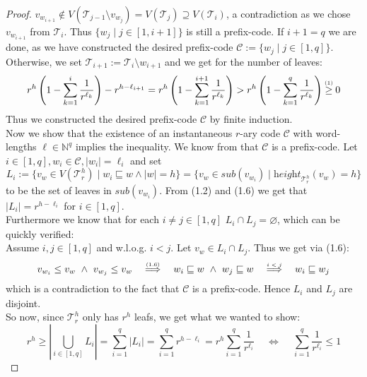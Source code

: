 \documentclass[12pt]{article}
\newcommand{\up}[2]{\mathrel{\overset{\makebox[0pt]{\mbox{\normalfont\tiny #2}}}{#1}}}
\newcommand{\T}[0]{{\mathcal{T}_r^h}}
\newcommand{\he}[0]{\textit{height}}
\newcommand{\SUB}[0]{\textit{sub}}
\newenvironment{statement3}[3]{\begin{trivlist}
\item[\hskip \labelsep {\bfseries #1}\hskip \labelsep {\bfseries #2} {#3}\textbf{.}]}{\end{trivlist}}
\begin{document}
\begin{statement3}{(1.7)}{Theorem}{(Kraft's Inequality)}
\begin{proof}
        $v_{w_{i+1}} \notin V(\mathcal{T}_{j-1} \setminus v_{w_j}) = V(\mathcal{T}_{j}) \supseteq V(\mathcal{T}_{i})$, a contradiction as we chose $v_{w_{i+1}}$ from $\mathcal{T}_i$.
        Thus $\{w_j \mid j \in [1, i+1]\}$ is still a prefix-code.
        If $i+1 = q$ we are done, as we have constructed the desired prefix-code
        $\mathcal{C} := \{w_j \mid j \in [1,q]\}$. Otherwise,
        we set $\mathcal{T}_{i+1} := \mathcal{T}_i \setminus w_{i+1}$ and we get for the number of leaves:
        $$
            r^h\left(1-\sum_{k=1}^{i} \frac{1}{r^{\ell_k}}\right) - r^{h - \ell_{i+1}}
            = r^h\left(1-\sum_{k=1}^{i+1} \frac{1}{r^{\ell_k}}\right)
            > r^h\left(1-\sum_{k=1}^{q} \frac{1}{r^{\ell_k}}\right)
            \up{\geq}{(1)} 0
        $$
        Thus we constructed the desired prefix-code $\mathcal{C}$ by finite induction.\\[10pt]
        Now we show that the existence of an instantaneous $r$-ary code $\mathcal{C}$ with word-lengths $\ell \in \mathbb{N}^q$ implies the inequality.
        We know from \cite{ICT} that $\mathcal{C}$ is a prefix-code. Let $i \in [1,q],
        w_i \in \mathcal{C}, |w_i| = \ell_i$ and set
        $$
            L_i := \{v_w \in V(\T) \mid w_i \sqsubseteq w \land |w| = h\}
            = \{v_w \in \SUB(v_{w_i}) \mid \he_\T(v_w) = h\}
        $$
        to be the set of leaves in $\SUB(v_{w_i})$. From (1.2) and (1.6) we get that $|L_i| = r^{h - \ell_i}$
        for $i \in [1,q]$.\\
        Furthermore we know that for each $i\neq j \in [1,q]$ $L_i \cap L_j = \varnothing$, which can be quickly
        verified:\\
        Assume $i,j \in [1,q]$ and w.l.o.g. $i < j$. Let $v_w \in L_i \cap L_j$. Thus we get via (1.6):
        $$
            v_{w_i} \leq v_w\ \land\ v_{w_j} \leq v_w
            \up{\quad\Longrightarrow\quad}{(1.6)} w_i \sqsubseteq w\ \land\ w_j \sqsubseteq w
            \up{\quad\Longrightarrow\quad}{$i < j$} w_i \sqsubseteq w_j
        $$
        which is a contradiction to the fact that $\mathcal{C}$ is a prefix-code. Hence $L_i$ and $L_j$ are disjoint.\\
        So now, since $\T$ only has $r^h$ leafs, we get what we wanted to show:
        $$
            r^h \geq |\bigcup_{i \in [1,q]} L_i| = \sum_{i = 1}^{q} |L_i| = \sum_{i=1}^{q} r^{h-\ell_i}
            = r^h\sum_{i=1}^{q} \frac{1}{r^{\ell_i}}
            \quad\,\Longleftrightarrow\,\quad \sum_{i=1}^{q} \frac{1}{r^{\ell_i}} \leq 1
        $$
    \end{proof}
\end{statement3}
\end{document}
